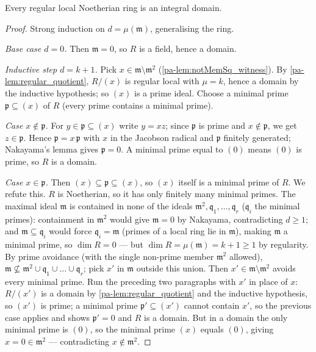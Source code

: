 \begin{theorem}
  \label{pa-thm:regular_isDomain}
  \leanok

  Every regular local Noetherian ring is an integral domain.
\end{theorem}
\begin{proof}
  \leanok
  Strong induction on \(d = \mu(\mathfrak m)\), generalising the ring.

  \emph{Base case \(d = 0\).} Then \(\mathfrak m = 0\), so \(R\) is a field, hence a
  domain.

  \emph{Inductive step \(d = k + 1\).} Pick \(x \in \mathfrak m \setminus \mathfrak m^2\)
  (\ref{pa-lem:notMemSq_witness}). By \ref{pa-lem:regular_quotient}, \(R/(x)\) is regular
  local with \(\mu = k\), hence a domain by the inductive hypothesis; so \((x)\) is a
  prime ideal. Choose a minimal prime \(\mathfrak p \subseteq (x)\) of \(R\) (every
  prime contains a minimal prime).

  \emph{Case \(x \notin \mathfrak p\).} For \(y \in \mathfrak p \subseteq (x)\) write
  \(y = xz\); since \(\mathfrak p\) is prime and \(x \notin \mathfrak p\), we get
  \(z \in \mathfrak p\). Hence \(\mathfrak p = x\,\mathfrak p\) with
  \(x\) in the Jacobson radical and \(\mathfrak p\) finitely generated; Nakayama's lemma
  gives \(\mathfrak p = 0\). A minimal prime equal to \((0)\) means \((0)\) is prime, so
  \(R\) is a domain.

  \emph{Case \(x \in \mathfrak p\).} Then \((x) \subseteq \mathfrak p \subseteq (x)\),
  so \((x)\) itself is a minimal prime of \(R\). We refute this. \(R\) is Noetherian, so
  it has only finitely many minimal primes. The maximal ideal \(\mathfrak m\) is
  contained in none of the ideals \(\mathfrak m^2, \mathfrak q_1, \dots, \mathfrak q_r\)
  (\(\mathfrak q_i\) the minimal primes): containment in \(\mathfrak m^2\) would give
  \(\mathfrak m = 0\) by Nakayama, contradicting \(d \geq 1\); and
  \(\mathfrak m \subseteq \mathfrak q_i\) would force \(\mathfrak q_i = \mathfrak m\)
  (primes of a local ring lie in \(\mathfrak m\)), making \(\mathfrak m\) a minimal
  prime, so \(\dim R = 0\) --- but \(\dim R = \mu(\mathfrak m) = k + 1 \geq 1\) by
  regularity. By prime avoidance (with the single non-prime member \(\mathfrak m^2\)
  allowed), \(\mathfrak m \not\subseteq \mathfrak m^2 \cup \mathfrak q_1 \cup \dots \cup
  \mathfrak q_r\); pick \(x'\) in \(\mathfrak m\) outside this union. Then
  \(x' \in \mathfrak m \setminus \mathfrak m^2\) avoids every minimal prime. Run the
  preceding two paragraphs with \(x'\) in place of \(x\): \(R/(x')\) is a domain by
  \ref{pa-lem:regular_quotient} and the inductive hypothesis, so \((x')\) is prime; a
  minimal prime \(\mathfrak p' \subseteq (x')\) cannot contain \(x'\), so the previous
  case applies and shows \(\mathfrak p' = 0\) and \(R\) is a domain. But in a domain the
  only minimal prime is \((0)\), so the minimal prime \((x)\) equals \((0)\), giving
  \(x = 0 \in \mathfrak m^2\) --- contradicting \(x \notin \mathfrak m^2\).
\end{proof}

